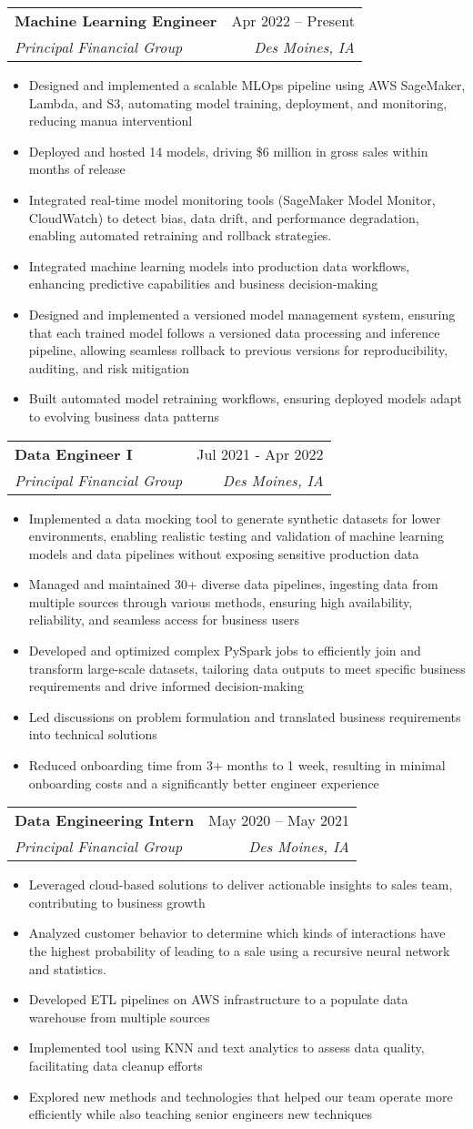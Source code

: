 \documentclass[letterpaper,11pt]{article}
\makeatletter
\newcommand{\resumeItem}[1]{
  \item\small{
    {#1 \vspace{-2pt}}
  }
}
\newcommand{\resumeSubheading}[4]{
  \vspace{-2pt}\item
    \begin{tabular*}{0.97\textwidth}[t]{l@{\extracolsep{\fill}}r}
      \textbf{#1} & #2 \\
      \textit{\small#3} & \textit{\small #4} \\
    \end{tabular*}\vspace{-7pt}
}
\newcommand{\resumeItemListStart}{\begin{itemize}}
\newcommand{\resumeItemListEnd}{\end{itemize}\vspace{-5pt}}
\makeatother
\begin{document}
    \resumeSubheading
      {Machine Learning Engineer}{Apr 2022 -- Present}
      {Principal Financial Group}{Des Moines, IA}
      \resumeItemListStart
	\resumeItem{Designed and implemented a scalable MLOps pipeline using AWS SageMaker, Lambda, and S3, automating model training, deployment, and monitoring, reducing manua interventionl}
	\resumeItem{Deployed and hosted 14 models, driving \$6 million in gross sales within months of release}
	\resumeItem{Integrated real-time model monitoring tools (SageMaker Model Monitor, CloudWatch) to detect bias, data drift, and performance degradation, enabling automated retraining and rollback strategies.}
	\resumeItem{Integrated machine learning models into production data workflows, enhancing predictive capabilities and business decision-making}
	\resumeItem{Designed and implemented a versioned model management system, ensuring that each trained model follows a versioned data processing and inference pipeline, allowing seamless rollback to previous versions for reproducibility, auditing, and risk mitigation}
	\resumeItem{Built automated model retraining workflows, ensuring deployed models adapt to evolving business data patterns}
      \resumeItemListEnd
      
    \resumeSubheading
	{Data Engineer I}{Jul 2021 - Apr 2022}
	{Principal Financial Group}{Des Moines, IA}
      \resumeItemListStart
	\resumeItem{Implemented a data mocking tool to generate synthetic datasets for lower environments, enabling realistic testing and validation of machine learning models and data pipelines without exposing sensitive production data}
	\resumeItem{Managed and maintained 30+ diverse data pipelines, ingesting data from multiple sources through various methods, ensuring high availability, reliability, and seamless access for business users}
	\resumeItem{Developed and optimized complex PySpark jobs to efficiently join and transform large-scale datasets, tailoring data outputs to meet specific business requirements and drive informed decision-making}
	\resumeItem{Led discussions on problem formulation and translated business requirements into technical solutions}
	\resumeItem{Reduced onboarding time from 3+ months to 1 week, resulting in minimal onboarding costs and a significantly better engineer experience}
    \resumeItemListEnd

    \resumeSubheading
	{Data Engineering Intern}{May 2020 -- May 2021}
	{Principal Financial Group}{Des Moines, IA}
      \resumeItemListStart
	\resumeItem{Leveraged cloud-based solutions to deliver actionable insights to sales team, contributing to business growth}
	\resumeItem{Analyzed customer behavior to determine which kinds of interactions have the highest probability of leading to a sale using a recursive neural network and statistics.}
	\resumeItem{Developed ETL pipelines on AWS infrastructure to a populate data warehouse from multiple sources}
	\resumeItem{Implemented tool using KNN and text analytics to assess data quality, facilitating data cleanup efforts}
	\resumeItem{Explored new methods and technologies that helped our team operate more efficiently while also teaching senior engineers new techniques}
      \resumeItemListEnd
\end{document}
